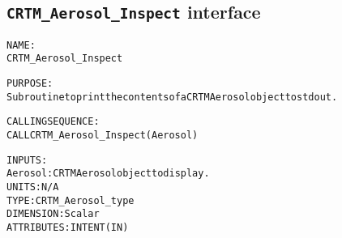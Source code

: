 \subsection{\texttt{CRTM\_Aerosol\_Inspect} interface}
  \label{sec:CRTM_Aerosol_Inspect_interface}
  \begin{alltt}
 
  NAME:
        CRTM_Aerosol_Inspect
 
  PURPOSE:
        Subroutine to print the contents of a CRTM Aerosol object to stdout.
 
  CALLING SEQUENCE:
        CALL CRTM_Aerosol_Inspect( Aerosol )
 
  INPUTS:
        Aerosol:       CRTM Aerosol object to display.
                       UNITS:      N/A
                       TYPE:       CRTM_Aerosol_type
                       DIMENSION:  Scalar
                       ATTRIBUTES: INTENT(IN)
 
  \end{alltt}
